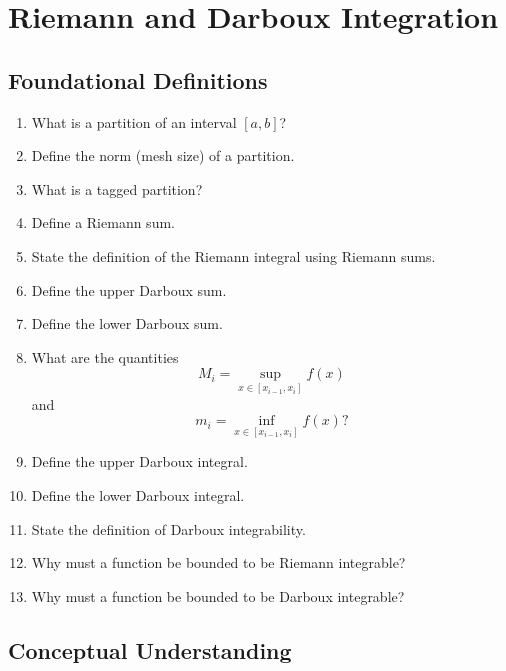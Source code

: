 \section{Riemann and Darboux Integration}

\subsection{Foundational Definitions}

\begin{enumerate}
  \item What is a partition of an interval \([a,b]\)?
  \item Define the norm (mesh size) of a partition.
  \item What is a tagged partition?
  \item Define a Riemann sum.
  \item State the definition of the Riemann integral using Riemann sums.
  \item Define the upper Darboux sum.
  \item Define the lower Darboux sum.
  \item What are the quantities
    \[ M_{i} = \sup_{x \in [x_{i-1},x_{i}]}f(x) \]
    and
    \[ m_{i} = \inf_{x \in [x_{i-1},x_{i}]}f(x)? \]
  \item Define the upper Darboux integral.
  \item Define the lower Darboux integral.
  \item State the definition of Darboux integrability.
  \item Why must a function be bounded to be Riemann integrable?
  \item Why must a function be bounded to be Darboux integrable?
\end{enumerate}

\subsection{Conceptual Understanding}


